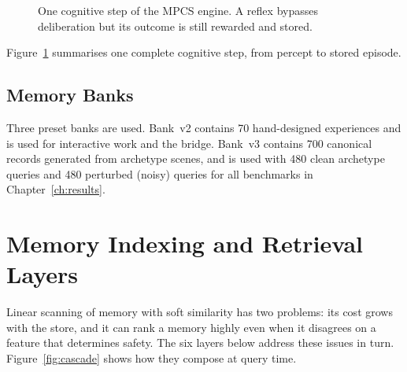 \documentclass[12pt,a4paper,oneside]{report}
\begin{document}
\begin{figure}[H]
\centering
{}
\caption{One cognitive step of the MPCS engine. A reflex bypasses deliberation but its outcome is still rewarded and stored.}
\label{fig:step}
\end{figure}

Figure~\ref{fig:step} summarises one complete cognitive step, from percept to stored episode.

\section{Memory Banks}
Three preset banks are used. Bank~v2 contains 70 hand-designed experiences and is used for interactive work and the bridge. Bank~v3 contains 700 canonical records generated from archetype scenes, and is used with 480 clean archetype queries and 480 perturbed (noisy) queries for all benchmarks in Chapter~\ref{ch:results}.

\chapter{Memory Indexing and Retrieval Layers}\label{ch:index}
Linear scanning of memory with soft similarity has two problems: its cost grows with the store, and it can rank a memory highly even when it disagrees on a feature that determines safety. The six layers below address these issues in turn. Figure~\ref{fig:cascade} shows how they compose at query time.
\end{document}
